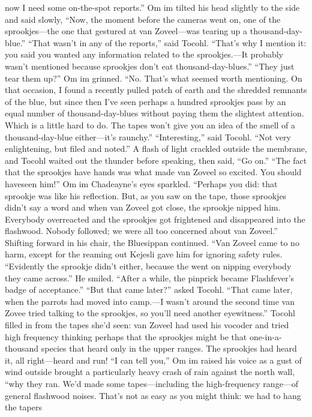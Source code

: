 \documentclass[9pt]{article}
\begin{document}
now I need some on-the-spot reports.”
Om im tilted his head slightly to the side and said slowly, “Now, the moment before the cameras
went on, one of the sprookjes—the one that gestured at van Zoveel—was tearing up a
thousand-day-blue.”
“That wasn’t in any of the reports,” said Tocohl.
“That’s why I mention it: you said you wanted any information related to the sprookjes.—It probably
wasn’t mentioned because sprookjes don’t eat thousand-day-blues.”
“They just tear them up?”
Om im grinned. “No. That’s what seemed worth mentioning. On that occasion, I found a recently
pulled patch of earth and the shredded remnants of the blue, but since then I’ve seen perhaps a hundred
sprookjes pass by an equal number of thousand-day-blues without paying them the slightest attention.
Which is a little hard to do. The tapes won’t give you an idea of the smell of a thousand-day-blue
either—it’s raunchy.”
“Interesting,” said Tocohl. “Not very enlightening, but filed and noted.” A flash of light crackled
outside the membrane, and Tocohl waited out the thunder before speaking, then said, “Go on.”
“The fact that the sprookjes have hands was what made van Zoveel so excited. You should haveseen him!” Om im Chadeayne’s eyes sparkled. “Perhaps you did: that sprookje was like his reflection.
But, as you saw on the tape, those sprookjes didn’t say a word and when van Zoveel got close, the
sprookje nipped him. Everybody overreacted and the sprookjes got frightened and disappeared into the
flashwood. Nobody followed; we were all too concerned about van Zoveel.”
Shifting forward in his chair, the Bluesippan continued. “Van Zoveel came to no harm, except for the
reaming out Kejesli gave him for ignoring safety rules. “Evidently the sprookje didn’t either, because the
went on nipping everybody they came across.” He smiled. “After a while, the pinprick became
Flashfever’s badge of acceptance.”
“But that came later?” asked Tocohl.
“That came later, when the parrots had moved into camp.—I wasn’t around the second time van
Zovee tried talking to the sprookjes, so you’ll need another eyewitness.”
Tocohl filled in from the tapes she’d seen: van Zoveel had used his vocoder and tried high frequency
thinking perhaps that the sprookjes might be that one-in-a-thousand species that heard only in the upper
ranges. The sprookjes had heard it, all right—heard and run!
“I can tell you,” Om im raised his voice as a gust of wind outside brought a particularly heavy crash
of rain against the north wall, “why they ran. We’d made some tapes—including the high-frequency
range—of general flashwood noises. That’s not as easy as you might think: we had to hang the tapers
\end{document}
